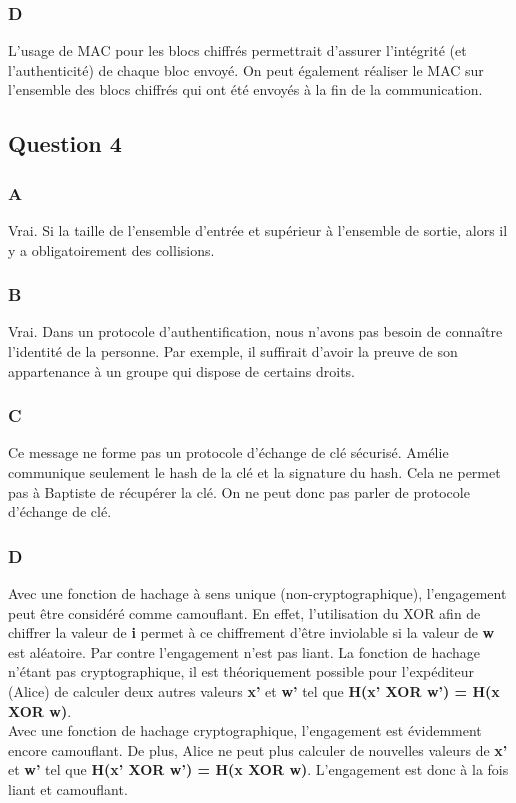 \documentclass[a4paper, 11pt, oneside]{article}
\begin{document}
\subsubsection{D}

L'usage de MAC pour les blocs chiffrés permettrait d'assurer l'intégrité (et l'authenticité) de chaque bloc envoyé. On peut également réaliser le MAC sur l'ensemble des blocs chiffrés qui ont été envoyés à la fin de la communication.

\subsection{Question 4}

\subsubsection{A}

Vrai. Si la taille de l’ensemble d'entrée et supérieur à l'ensemble de sortie, alors il y a obligatoirement des collisions. 

\subsubsection{B}

Vrai. Dans un protocole d’authentification, nous n'avons pas besoin de connaître l'identité de la personne. Par exemple, il suffirait d'avoir la preuve de son appartenance à un groupe qui dispose de certains droits. 

\subsubsection{C}

Ce message ne forme pas un protocole d'échange de clé sécurisé. Amélie communique seulement le hash de la clé et la signature du hash. Cela ne permet pas à Baptiste de récupérer la clé. On ne peut donc pas parler de protocole d'échange de clé.

\subsubsection{D}

Avec une fonction de hachage à sens unique (non-cryptographique), l'engagement peut être considéré comme camouflant. En effet, l'utilisation du XOR afin de chiffrer la valeur de \textbf{i} permet à ce chiffrement d'être inviolable si la valeur de \textbf{w} est aléatoire.
Par contre l'engagement n'est pas liant. La fonction de hachage n'étant pas cryptographique, il est théoriquement possible pour l’expéditeur (Alice) de calculer deux autres valeurs \textbf{x'} et \textbf{w'} tel que \textbf{H(x' XOR w') = H(x XOR w)}. 
\\[5pt]
Avec une fonction de hachage cryptographique, l'engagement est évidemment encore camouflant. De plus, Alice ne peut plus calculer de nouvelles valeurs de \textbf{x'} et \textbf{w'} tel que \textbf{H(x' XOR w') = H(x XOR w)}. L'engagement est donc à la fois liant et camouflant.
\end{document}
